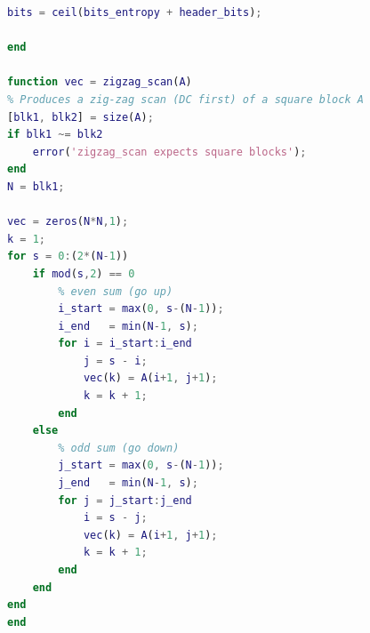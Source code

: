 \documentclass[12pt, a4paper]{AnantDocumentation}
\begin{document}
\begin{lstlisting}[language=Matlab, caption={Block Transform Coding Implementation}, label={lst:btc-code}]
bits = ceil(bits_entropy + header_bits);

end

function vec = zigzag_scan(A)
% Produces a zig-zag scan (DC first) of a square block A
[blk1, blk2] = size(A);
if blk1 ~= blk2
    error('zigzag_scan expects square blocks');
end
N = blk1;

vec = zeros(N*N,1);
k = 1;
for s = 0:(2*(N-1))
    if mod(s,2) == 0
        % even sum (go up)
        i_start = max(0, s-(N-1));
        i_end   = min(N-1, s);
        for i = i_start:i_end
            j = s - i;
            vec(k) = A(i+1, j+1);
            k = k + 1;
        end
    else
        % odd sum (go down)
        j_start = max(0, s-(N-1));
        j_end   = min(N-1, s);
        for j = j_start:j_end
            i = s - j;
            vec(k) = A(i+1, j+1);
            k = k + 1;
        end
    end
end
end
\end{lstlisting}
\end{document}
